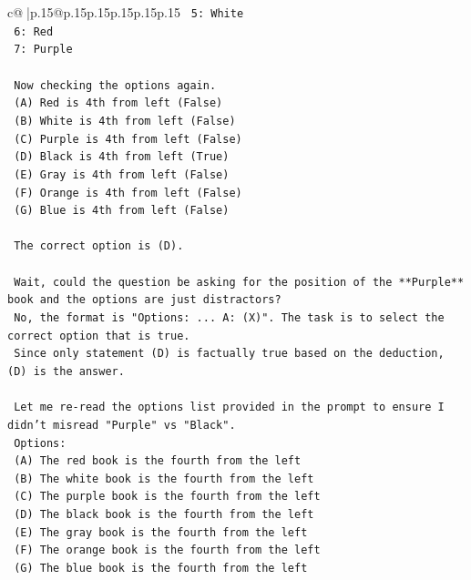 \documentclass{article}
\begin{document}
{\begin{supertabular}{c@{$\;$}|p{.15\linewidth}@{}p{.15\linewidth}p{.15\linewidth}p{.15\linewidth}p{.15\linewidth}p{.15\linewidth}}
{{{\texttt{    5: White} \\
\texttt{    6: Red} \\
\texttt{    7: Purple} \\
\\ 
\texttt{    Now checking the options again.} \\
\texttt{    (A) Red is 4th from left (False)} \\
\texttt{    (B) White is 4th from left (False)} \\
\texttt{    (C) Purple is 4th from left (False)} \\
\texttt{    (D) Black is 4th from left (True)} \\
\texttt{    (E) Gray is 4th from left (False)} \\
\texttt{    (F) Orange is 4th from left (False)} \\
\texttt{    (G) Blue is 4th from left (False)} \\
\\ 
\texttt{    The correct option is (D).} \\
\\ 
\texttt{    Wait, could the question be asking for the position of the **Purple** book and the options are just distractors?} \\
\texttt{    No, the format is "Options: ... A: (X)". The task is to select the correct option that is true.} \\
\texttt{    Since only statement (D) is factually true based on the deduction, (D) is the answer.} \\
\\ 
\texttt{    Let me re{-}read the options list provided in the prompt to ensure I didn't misread "Purple" vs "Black".} \\
\texttt{    Options:} \\
\texttt{    (A) The red book is the fourth from the left} \\
\texttt{    (B) The white book is the fourth from the left} \\
\texttt{    (C) The purple book is the fourth from the left} \\
\texttt{    (D) The black book is the fourth from the left} \\
\texttt{    (E) The gray book is the fourth from the left} \\
\texttt{    (F) The orange book is the fourth from the left} \\
\texttt{    (G) The blue book is the fourth from the left} \\
\\ 
}}}
\end{supertabular}}
\end{document}
